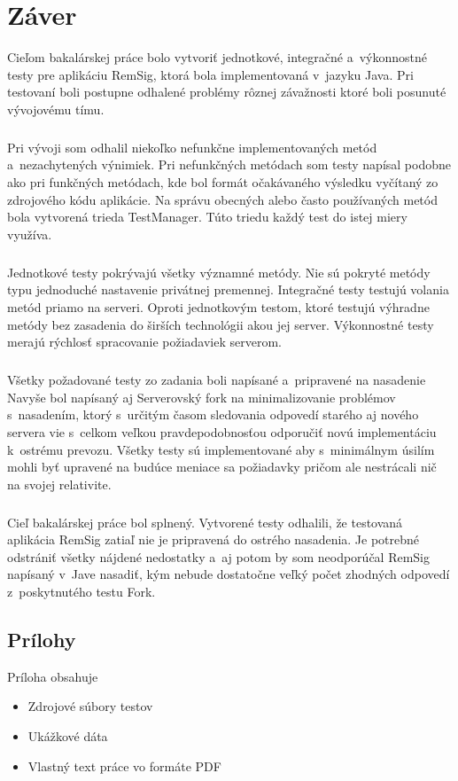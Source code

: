 \documentclass[
  digital, %
  table,   %
oneside,
  nolof,     %
  nolot,     %
]{fithesis3}
\begin{document}
\chapter{Záver}
Cieľom bakalárskej práce bolo vytvoriť jednotkové, integračné a~výkonnostné testy pre aplikáciu RemSig, ktorá bola implementovaná v~jazyku Java. Pri testovaní boli postupne odhalené problémy rôznej závažnosti ktoré boli posunuté vývojovému tímu. \paragraph{}
Pri vývoji som odhalil niekoľko nefunkčne implementovaných metód a~nezachytených výnimiek. Pri nefunkčných metódach som testy napísal podobne ako pri funkčných metódach, kde bol formát očakávaného výsledku vyčítaný zo zdrojového kódu aplikácie. Na správu obecných alebo často používaných metód bola vytvorená trieda TestManager. Túto triedu každý test do istej miery využíva. \paragraph{}
Jednotkové testy pokrývajú všetky významné metódy. Nie sú pokryté metódy typu jednoduché nastavenie privátnej premennej. Integračné testy testujú volania metód priamo na serveri. Oproti jednotkovým testom, ktoré testujú výhradne metódy bez zasadenia do širších technológii akou jej server. Výkonnostné testy merajú rýchlosť spracovanie požiadaviek serverom.\paragraph{}
Všetky požadované testy zo zadania boli napísané a~pripravené na nasadenie Navyše bol napísaný aj Serverovský fork na minimalizovanie problémov s~nasadením, ktorý s~určitým časom sledovania odpovedí starého aj nového servera vie s~celkom veľkou pravdepodobnosťou odporučiť novú implementáciu k~ostrému prevozu. Všetky testy sú  implementované aby s~minimálnym úsilím mohli byť upravené na budúce meniace sa požiadavky pričom ale nestrácali nič na svojej relativite.\paragraph{}
Cieľ bakalárskej práce bol splnený. Vytvorené testy odhalili, že testovaná aplikácia RemSig zatiaľ nie je pripravená do ostrého nasadenia. Je potrebné odstrániť všetky nájdené nedostatky a~aj potom by som neodporúčal RemSig napísaný v~Jave nasadiť, kým nebude dostatočne veľký počet zhodných odpovedí z~poskytnutého testu Fork.  

\printbibliography

\nocite{*} 
  

\begin{appendix}


\chapter{Prílohy}
Príloha obsahuje
\begin{itemize}
	\item Zdrojové súbory testov
	\item Ukážkové dáta 
	\item Vlastný text práce vo formáte PDF
\end{itemize}



\end{appendix}
\end{document}
